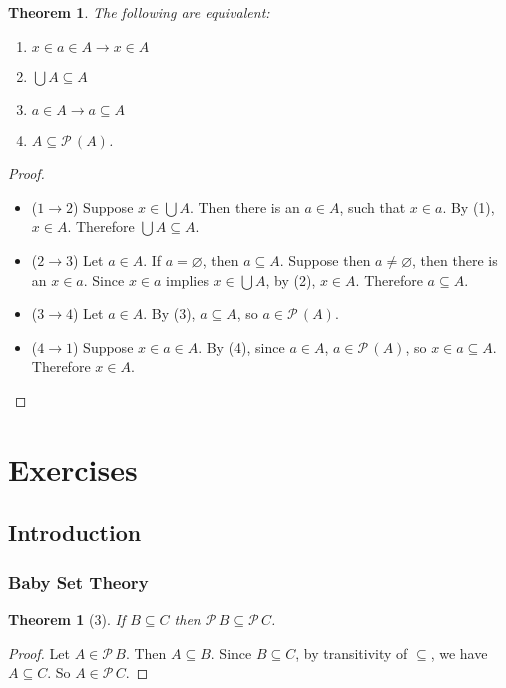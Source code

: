 \documentclass[12pt]{article}
\theoremstyle{plain}
\newtheorem{thm}{Theorem}[section]
\newtheorem*{exthm}{Theorem}
\theoremstyle{remark}
\theoremstyle{definition}
\theoremstyle{remark}
\newcommand{\powerset}{\mathscr{P}\,}
\begin{document}
\begin{thm}
  The following are equivalent:
  \begin{enumerate}
    \item $x \in a \in A \rightarrow x \in A$
    \item $\bigcup A \subseteq A$
    \item $a \in A \rightarrow a \subseteq A$
    \item $A \subseteq \powerset(A)$.
  \end{enumerate}
\end{thm}
\begin{proof}
  \begin{itemize}
    \item ($1 \rightarrow 2$) Suppose $x \in \bigcup A$. Then there is an $a \in A$, such that $x \in a$. By (1), $x \in A$. Therefore $\bigcup A \subseteq A$.

    \item ($2 \rightarrow 3$) Let $a \in A$. If $a = \varnothing$, then $a \subseteq A$. Suppose then $a \neq \varnothing$, then there is an $x \in a$. Since $x \in a$ implies $x \in \bigcup A$, by (2), $x \in A$. Therefore $a \subseteq A$.

    \item ($3 \rightarrow 4$) Let $a \in A$. By (3), $a \subseteq A$, so $a \in \powerset(A)$.

    \item ($4 \rightarrow 1$) Suppose $x \in a \in A$. By (4), since $a \in A$, $a \in \powerset(A)$, so $x \in a \subseteq A$. Therefore $x \in A$.
  \end{itemize}
\end{proof}

\section{Exercises}
\subsection{Introduction}

\subsubsection{Baby Set Theory}
\begin{exthm}[3]
  If $B \subseteq C$ then $\powerset B \subseteq \powerset C$.
\end{exthm}
\begin{proof}
  Let $A \in \powerset B$. Then $A \subseteq B$. Since $B \subseteq C$, by transitivity of $\subseteq$, we have $A \subseteq C$. So $A \in \powerset C$.
\end{proof}
\end{document}
